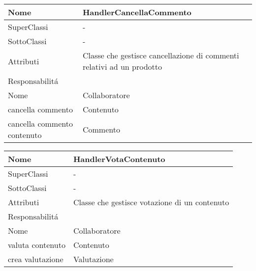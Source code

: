 \begin{center}
    \begin{tabular}{ |p{3cm}|p{3cm}|p{3cm}|p{3cm}| }
        \hline
        Nome & \multicolumn{3}{|p{9cm}|}{HandlerCancellaCommento} \\\hline
        SuperClassi & \multicolumn{3}{|p{9cm}|}{-} \\\hline
        SottoClassi & \multicolumn{3}{|p{9cm}|}{-} \\\hline
        Attributi & \multicolumn{3}{|p{9cm}|}{Classe che gestisce cancellazione di commenti relativi ad un prodotto} \\\hline
        \multicolumn{4}{|p{12cm}|}{Responsabilit\'a} \\\hline
        \multicolumn{2}{|p{6cm}|}{Nome} & \multicolumn{2}{|p{6cm}|}{Collaboratore} \\\hline
        \multicolumn{2}{|p{6cm}|}{cancella commento} & \multicolumn{2}{|p{6cm}|}{Contenuto} \\\hline
        \multicolumn{2}{|p{6cm}|}{cancella commento contenuto} & \multicolumn{2}{|p{6cm}|}{Commento} \\\hline
    \end{tabular}
\end{center}

\begin{center}
    \begin{tabular}{ |p{3cm}|p{3cm}|p{3cm}|p{3cm}| }
        \hline
        Nome & \multicolumn{3}{|p{9cm}|}{HandlerVotaContenuto} \\\hline
        SuperClassi & \multicolumn{3}{|p{9cm}|}{-} \\\hline
        SottoClassi & \multicolumn{3}{|p{9cm}|}{-} \\\hline
        Attributi & \multicolumn{3}{|p{9cm}|}{Classe che gestisce votazione di un contenuto} \\\hline
        \multicolumn{4}{|p{12cm}|}{Responsabilit\'a} \\\hline
        \multicolumn{2}{|p{6cm}|}{Nome} & \multicolumn{2}{|p{6cm}|}{Collaboratore} \\\hline
        \multicolumn{2}{|p{6cm}|}{valuta contenuto} & \multicolumn{2}{|p{6cm}|}{Contenuto} \\\hline
        \multicolumn{2}{|p{6cm}|}{crea valutazione} & \multicolumn{2}{|p{6cm}|}{Valutazione} \\\hline
    \end{tabular}
\end{center}


